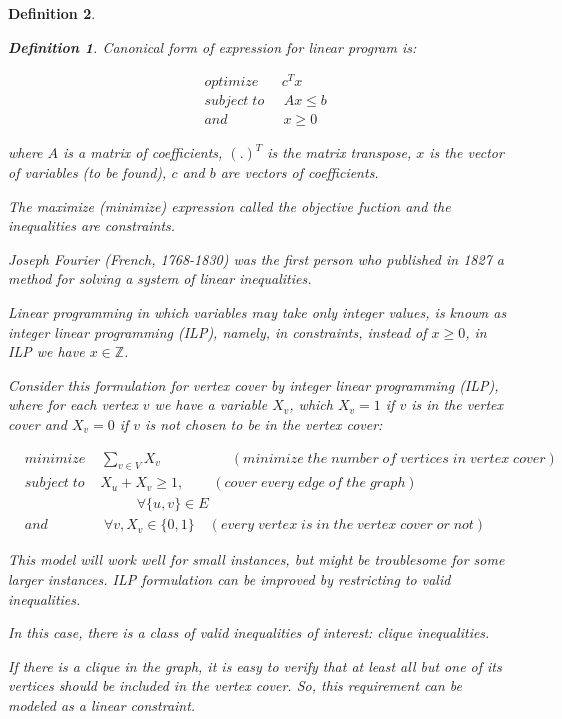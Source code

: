 \documentclass[12pt]{article}
\theoremstyle{slplain}
\newtheorem{defi}{Definition}
\begin{document}
\begin{defi}
\begin{defi}
Canonical form of expression for linear program is:

\begin{align*}
&optimize \; \;\; \;\;\; c^Tx\\
&subject\; to \;\;\; \;\; Ax \leq b\\
&and	\qquad\qquad	 x \geq 0
\end{align*}

where $A$ is a matrix of coefficients, $(.)^T$ is the matrix transpose, $x$ is the vector of variables (to be found), $c$ and $b$ are vectors of coefficients.

The maximize (minimize) expression called the objective fuction and the inequalities are constraints.

Joseph Fourier (French, 1768-1830) was the first person who published in 1827 a method for solving a system of linear inequalities. \cite{gerard}

Linear programming in which variables may take only integer values, is known as integer linear programming (ILP), namely, in constraints, instead of $x\geq 0$, in ILP we have $x\in \mathbb{Z}$.
\end{defi}


Consider this formulation for vertex cover by integer linear programming (ILP), where for each vertex $v$ we have a variable $X_v$, which $X_v = 1$ if $v$ is in the vertex cover and $X_v = 0$ if $v$ is not chosen to be in the vertex cover:

\begin{align*}
&minimize \; \;\; \; \sum_{v\in V}X_v \qquad\qquad\quad (minimize \; the \; number \;  of \;  vertices \; in \; vertex \; cover)\\
&subject\; to \;\;\; \; X_u + X_v  \geq 1 , \qquad (cover \; every \; edge \; of \; the \; graph)\\
&\qquad 	\qquad\qquad\qquad	 \forall \{u,v\} \in E\\
&and	\qquad\qquad	 \forall v, X_v\in \{0,1\} \quad (every \; vertex \; is \; in \; the \; vertex \; cover \; or \; not)
\end{align*}

This model will work well for small instances, but might be troublesome for some larger instances. ILP formulation can be improved  by restricting to valid inequalities.\cite{Gerard2} 

In this case, there is a class of valid inequalities of interest: clique inequalities.

If there is a clique in the graph, it is easy to verify that at least all but one
of its vertices should be included in the vertex cover. So, this requirement can be modeled as a linear constraint.


\end{defi}
\end{document}
